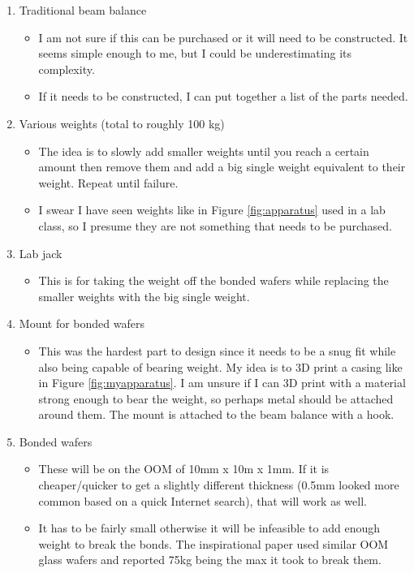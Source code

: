 \documentclass[colorlinks=true,pdfstartview=FitV,linkcolor=blue,
            citecolor=red,urlcolor=magenta]{ligodoc}
\begin{document}
\begin{enumerate}
  \item Traditional beam balance
    \begin{itemize}
    \item I am not sure if this can be purchased or it will need to be constructed. It seems simple enough to me, but I could be underestimating its complexity.
    \item If it needs to be constructed, I can put together a list of the parts needed.
    \end{itemize}
  \item Various weights (total to roughly 100 kg)
    \begin{itemize}
    \item The idea is to slowly add smaller weights until you reach a certain amount then remove them and add a big single weight equivalent to their weight. Repeat until failure.
    \item I swear I have seen weights like in Figure \ref{fig:apparatus} used in a lab class, so I presume they are not something that needs to be purchased.
    \end{itemize}
  \item Lab jack
    \begin{itemize}
    \item This is for taking the weight off the bonded wafers while replacing the smaller weights with the big single weight.
    \end{itemize}
  \item Mount for bonded wafers
    \begin{itemize}
    \item This was the hardest part to design since it needs to be a snug fit while also being capable of bearing weight. My idea is to 3D print a casing like in Figure \ref{fig:myapparatus}. I am unsure if I can 3D print with a material strong enough to bear the weight, so perhaps metal should be attached around them. The mount is attached to the beam balance with a hook.
    \end{itemize}
  \item Bonded wafers
    \begin{itemize}
    \item These will be on the OOM of 10mm x 10m x 1mm. If it is cheaper/quicker to get a slightly different thickness (0.5mm looked more common based on a quick Internet search), that will work as well.
    \item It has to be fairly small otherwise it will be infeasible to add enough weight to break the bonds. The inspirational paper used similar OOM glass wafers and reported 75kg being the max it took to break them.
    \end{itemize}
\end{enumerate}
\end{document}
